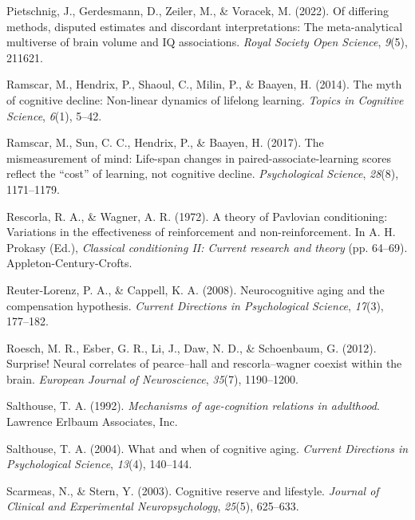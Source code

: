 \documentclass[
  man,floatsintext]{apa6}
\newlength{\cslhangindent}
\newlength{\cslentryspacingunit} %
\newenvironment{CSLReferences}[2] %
 {%
  \setlength{\parindent}{0pt}
  \ifodd #1
  \let\oldpar\par
  \def\par{\hangindent=\cslhangindent\oldpar}
  \fi
  \setlength{\parskip}{#2\cslentryspacingunit}
 }%
 {}
\begin{document}
\begin{CSLReferences}{1}{0}
\leavevmode{}%
Pietschnig, J., Gerdesmann, D., Zeiler, M., \& Voracek, M. (2022). Of differing methods, disputed estimates and discordant interpretations: The meta-analytical multiverse of brain volume and IQ associations. \emph{Royal Society Open Science}, \emph{9}(5), 211621.

\leavevmode{}%
Ramscar, M., Hendrix, P., Shaoul, C., Milin, P., \& Baayen, H. (2014). The myth of cognitive decline: Non-linear dynamics of lifelong learning. \emph{Topics in Cognitive Science}, \emph{6}(1), 5--42.

\leavevmode{}%
Ramscar, M., Sun, C. C., Hendrix, P., \& Baayen, H. (2017). The mismeasurement of mind: Life-span changes in paired-associate-learning scores reflect the {``cost''} of learning, not cognitive decline. \emph{Psychological Science}, \emph{28}(8), 1171--1179.

\leavevmode{}%
Rescorla, R. A., \& Wagner, A. R. (1972). {A theory of Pavlovian conditioning: Variations in the effectiveness of reinforcement and non-reinforcement}. In A. H. Prokasy (Ed.), \emph{Classical conditioning II: Current research and theory} (pp. 64--69). Appleton-Century-Crofts.

\leavevmode{}%
Reuter-Lorenz, P. A., \& Cappell, K. A. (2008). Neurocognitive aging and the compensation hypothesis. \emph{Current Directions in Psychological Science}, \emph{17}(3), 177--182.

\leavevmode{}%
Roesch, M. R., Esber, G. R., Li, J., Daw, N. D., \& Schoenbaum, G. (2012). Surprise! Neural correlates of pearce--hall and rescorla--wagner coexist within the brain. \emph{European Journal of Neuroscience}, \emph{35}(7), 1190--1200.

\leavevmode{}%
Salthouse, T. A. (1992). \emph{Mechanisms of age-cognition relations in adulthood}. Lawrence Erlbaum Associates, Inc.

\leavevmode{}%
Salthouse, T. A. (2004). {What and when of cognitive aging}. \emph{Current Directions in Psychological Science}, \emph{13}(4), 140--144.

\leavevmode{}%
Scarmeas, N., \& Stern, Y. (2003). Cognitive reserve and lifestyle. \emph{Journal of Clinical and Experimental Neuropsychology}, \emph{25}(5), 625--633.


\end{CSLReferences}
\end{document}
